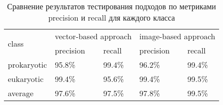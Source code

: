 \begin{table}[h]
\begin{tabular}{|l|l|l|l|l|}
\hline
\multirow{2}{*}{class} & \multicolumn{2}{l|}{vector-based approach} & \multicolumn{2}{l|}{image-based approach} \\ \cline{2-5} 
                       & precision             & recall             & precision             & recall            \\ \hline
prokaryotic            & 95.8\%                & 99.4\%             & 96.2\%                & 99.4\%            \\ \hline
eukaryotic             & 99.4\%                & 95.6\%             & 99.4\%                & 99.5\%            \\ \hline
average             & 97.6\%                & 97.5\%             & 97.8\%                & 99.5\%            \\ \hline
\end{tabular}
\caption{Сравнение результатов тестирования подходов по метриками precision и recall для каждого класса}
\label{metrics_ep}
\end{table}